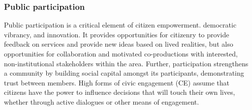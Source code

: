 \subsubsection{Public participation}
Public participation is a critical element of citizen empowerment. democratic vibrancy, and innovation\cite{Afzalan2017}.%
It provides opportunities for citizenry to provide feedback on services and provide new ideas based on lived realities, but also opportunities for collaboration and motivated co-productions with interested, non-institutional stakeholders within the area\cite{Acedo2019}. %
Further, participation strengthens a community by building social capital amongst its participants, demonstrating trust between members\cite{Evans-Cowley2010}. %
High forms of civic engagement (CE) assume that citizens have the power to influence decisions that will touch their own lives, whether through active dialogues or other means of engagement. %

